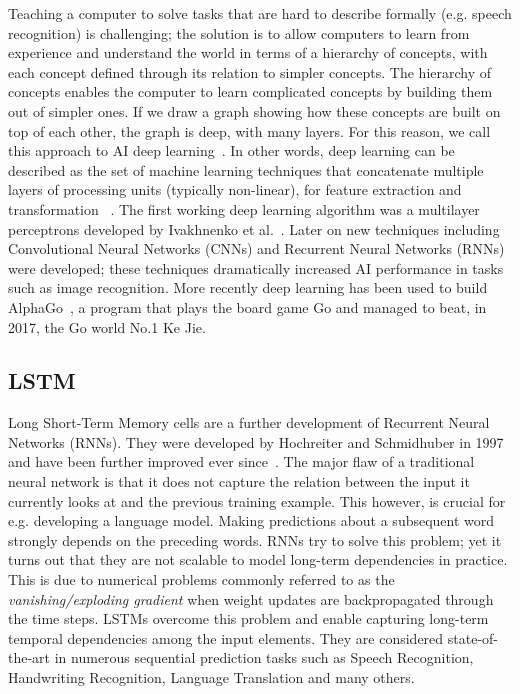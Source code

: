 Teaching a computer to solve tasks that are hard to describe formally (e.g. speech recognition) is challenging; the solution is to allow computers to learn from experience and understand the world in terms of a hierarchy of concepts, with each concept defined through its relation to simpler concepts. The hierarchy of concepts enables the computer to learn complicated concepts by building them out of simpler ones. If we draw a graph showing how these concepts are built on top of each other, the graph is deep, with many layers. For this reason, we call this approach to AI deep learning~\cite{Goodfellow-et-al-2016}. In other words, deep learning can be described as the set of machine learning techniques that concatenate multiple layers of processing units (typically non-linear), for feature extraction and transformation  ~\cite{deep_learning_heterogeneus}. The first working deep learning algorithm was a multilayer perceptrons developed by Ivakhnenko et al.~\cite{ivakhnenko1973cybernetic}. Later on new techniques including Convolutional Neural Networks (CNNs) and Recurrent Neural Networks (RNNs) were developed; these techniques dramatically increased AI performance in tasks such as image recognition. More recently deep learning has been used to build AlphaGo~\cite{alphago}, a program that plays the board game Go and managed to beat, in 2017, the Go world No.1 Ke Jie.

\subsection{LSTM}
Long Short-Term Memory cells are a further development of Recurrent Neural Networks (RNNs). They were developed by Hochreiter and Schmidhuber in 1997 and have been further improved ever since~\cite{Greff2016}. The major flaw of a traditional neural network is that it does not capture the relation between the input it currently looks at and the previous training example. This however, is crucial for e.g. developing a language model. Making predictions about a subsequent word strongly depends on the preceding words. RNNs try to solve this problem; yet it turns out that they are not scalable to model long-term dependencies in practice. This is due to numerical problems commonly referred to as the \textit{vanishing/exploding gradient} when weight updates are backpropagated through the time steps. LSTMs overcome this problem and enable capturing long-term temporal dependencies among the input elements. They are considered state-of-the-art in numerous sequential prediction tasks such as Speech Recognition, Handwriting Recognition, Language Translation and many others.

